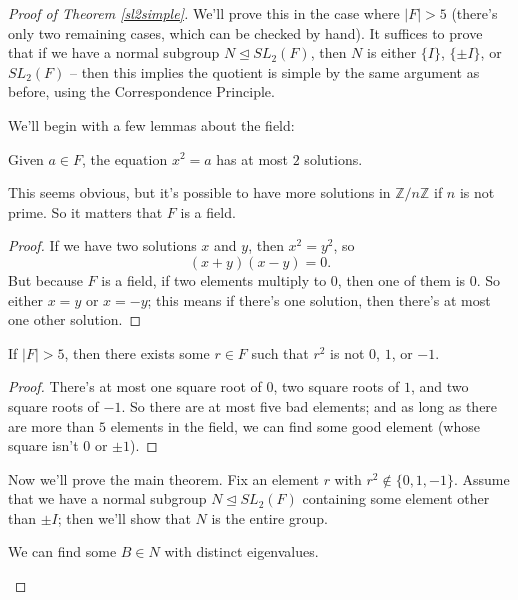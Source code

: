 \begin{proof}[Proof of Theorem \ref{sl2simple}]
    We'll prove this in the case where $|F| > 5$ (there's only two remaining cases, which can be checked by hand). It suffices to prove that if we have a normal subgroup $N \trianglelefteq SL_2(F)$, then $N$ is either $\{I\}$, $\{\pm I\}$, or $SL_2(F)$ -- then this implies the quotient is simple by the same argument as before, using the Correspondence Principle. 

    We'll begin with a few lemmas about the field:
    
    \begin{lemma}
        Given $a \in F$, the equation $x^2 = a$ has at most $2$ solutions. 
    \end{lemma}
    
    This seems obvious, but it's possible to have more solutions in $\mathbb{Z}/n\mathbb{Z}$ if $n$ is not prime. So it matters that $F$ is a field. 
    
    \begin{proof}
        If we have two solutions $x$ and $y$, then $x^2 = y^2$, so \[(x + y)(x - y) = 0.\] But because $F$ is a field, if two elements multiply to $0$, then one of them is $0$. So either $x = y$ or $x = -y$; this means if there's one solution, then there's at most one other solution. 
    \end{proof}

    \begin{lemma}
        If $|F| > 5$, then there exists some $r \in F$ such that $r^2$ is not $0$, $1$, or $-1$. 
    \end{lemma}

    \begin{proof}
        There's at most one square root of $0$, two square roots of $1$, and two square roots of $-1$. So there are at most five bad elements; and as long as there are more than $5$ elements in the field, we can find some good element (whose square isn't $0$ or $\pm 1$).
    \end{proof}

    Now we'll prove the main theorem. Fix an element $r$ with $r^2 \not\in\{0, 1, -1\}$. Assume that we have a normal subgroup $N \trianglelefteq SL_2(F)$ containing some element other than $\pm I$; then we'll show that $N$ is the entire group. 
    
    \begin{claim}
        We can find some $B \in N$ with distinct eigenvalues. 
    \end{claim}


\end{proof}
